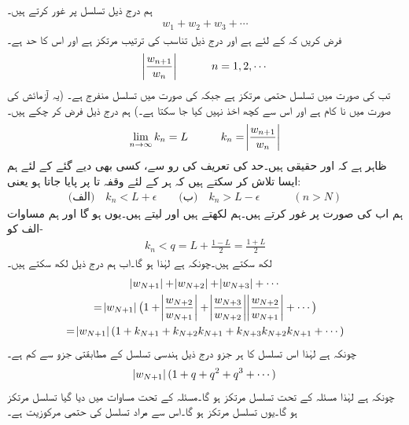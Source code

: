 \quad {}\\
ہم درج ذیل تسلسل پر غور کرتے ہیں۔
\begin{align*}
w_1+w_2+w_3+\cdots
\end{align*}
فرض کریں کہ  کے لئے  ہے اور درج ذیل تناسب کی ترتیب مرتکز ہے اور اس  کا حد  ہے۔
\begin{align*}
\abs{\frac{w_{n+1}}{w_n}}\quad \quad \quad n=1,2,\cdots
\end{align*}
تب  کی صورت میں تسلسل حتمی مرتکز ہے جبکہ  کی صورت میں تسلسل منفرج ہے۔ (یہ آزمائش  کی صورت میں نا کام ہے اور اس سے کچھ اخذ نہیں کیا جا سکتا ہے۔)
\quad
ہم درج ذیل فرض کر چکے ہیں۔
\begin{align*}
\lim_{n\to\infty} k_n=L \quad \quad \quad k_n=\abs{\frac{w_{n+1}}{w_n}}
\end{align*}
ظاہر ہے کہ  اور  حقیقی ہیں۔حد کی تعریف کی رو سے، کسی بھی دیے گئے  کے لئے ہم ایسا  تلاش کر سکتے ہیں کہ ہر  کے لئے  وقفہ  تا  پر پایا جاتا ہو یعنی:
\begin{align}\label{مساوات_ترتیب_نسبت_الف}
\text{(الف)}\quad k_n<L+\epsilon \quad \quad \text{(ب)}\quad k_n>L-\epsilon\quad \quad \quad (n>N)
\end{align}
ہم اب  کی صورت پر غور کرتے ہیں۔ہم  لکھتے ہیں اور  لیتے ہیں۔یوں  ہو گا اور ہم  مساوات -الف کو
\begin{align*}
k_n<q=L+\frac{1-L}{2}=\frac{1+L}{2}
\end{align*}
لکھ سکتے ہیں۔چونکہ  ہے لہٰذا  ہو گا۔اب ہم درج ذیل لکھ سکتے ہیں۔
\begin{multline}\label{مساوات_ترتیب_نسبت_ب}
\abs{w_{N+1}}+\abs{w_{N+2}}+\abs{w_{N+3}}+\cdots\\
=\abs{w_{N+1}}\big(1+\abs{\frac{w_{N+2}}{w_{N+1}}}+\abs{\frac{w_{N+3}}{w_{N+2}}}\abs{\frac{w_{N+2}}{w_{N+1}}}+\cdots\big)\\
=\abs{w_{N+1}}(1+k_{N+1}+k_{N+2}k_{N+1}+k_{N+3}k_{N+2}k_{N+1}+\cdots)
\end{multline}
چونکہ  ہے لہٰذا اس تسلسل کا ہر جزو درج ذیل ہندسی تسلسل کے مطابقتی جزو سے کم ہے۔
\begin{align*}
\abs{w_{N+1}}(1+q+q^2+q^3+\cdots)
\end{align*}
چونکہ  ہے لہٰذا مسئلہ  کے تحت تسلسل مرتکز ہو گا۔مسئلہ  کے تحت  مساوات  میں دیا گیا تسلسل مرتکز ہو گا۔یوں تسلسل  مرتکز ہو گا۔اس سے مراد تسلسل  کی حتمی مرکوزیت ہے۔

